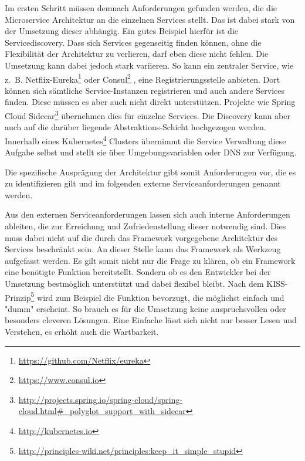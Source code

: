 
Im ersten Schritt müssen demnach Anforderungen gefunden werden, die die Microservice Architektur an die einzelnen Services stellt. Das ist dabei stark von der Umsetzung dieser abhängig. Ein gutes Beispiel hierfür ist die Servicediscovery. Dass sich Services gegenseitig finden können, ohne die Flexibilität der Architektur zu verlieren, darf eben diese nicht fehlen. Die Umsetzung kann dabei jedoch stark variieren. So kann ein zentraler Service, wie z.~B. Netflix-Eureka\footnote{
\url{https://github.com/Netflix/eureka}
}
oder Consul\footnote{
\url{https://www.consul.io}
}
, eine Registrierungsstelle anbieten. Dort können sich sämtliche Service-Instanzen registrieren und auch andere Services finden. Diese müssen es aber auch nicht direkt unterstützen. Projekte wie Spring Cloud Sidecar\footnote{
\url{http://projects.spring.io/spring-cloud/spring-cloud.html\#_polyglot_support_with_sidecar}
}
übernehmen dies für einzelne Services. Die Discovery kann aber auch auf die darüber liegende Abstraktions-Schicht hochgezogen werden. Innerhalb eines Kubernetes\footnote{
\url{http://kubernetes.io}
}
Clusters übernimmt die Service Verwaltung diese Aufgabe selbst und stellt sie über Umgebungsvariablen oder DNS zur Verfügung. 


Die spezifische Ausprägung der Architektur gibt somit Anforderungen vor, die es zu identifizieren gilt und im folgenden externe Serviceanforderungen genannt werden.


Aus den externen Serviceanforderungen lassen sich auch interne Anforderungen ableiten, die zur Erreichung und Zufriedenstellung dieser notwendig sind. Dies muss dabei nicht auf die durch das Framework vorgegebene Architektur des Services beschränkt sein. An dieser Stelle kann das Framework als Werkzeug aufgefasst werden. Es gilt somit nicht nur die Frage zu klären, ob ein Framework eine benötigte Funktion bereitstellt. Sondern ob es den Entwickler bei der Umsetzung bestmöglich unterstützt und dabei flexibel bleibt. Nach dem KISS-Prinzip\footnote{
\url{http://principles-wiki.net/principles:keep_it_simple_stupid}
} 
wird zum Beispiel die Funktion bevorzugt, die möglichst einfach und "dumm" erscheint. So brauch es für die Umsetzung keine anspruchsvollen oder besonders cleveren Lösungen. Eine Einfache lässt sich nicht nur besser Lesen und Verstehen, es erhöht auch die Wartbarkeit.  

